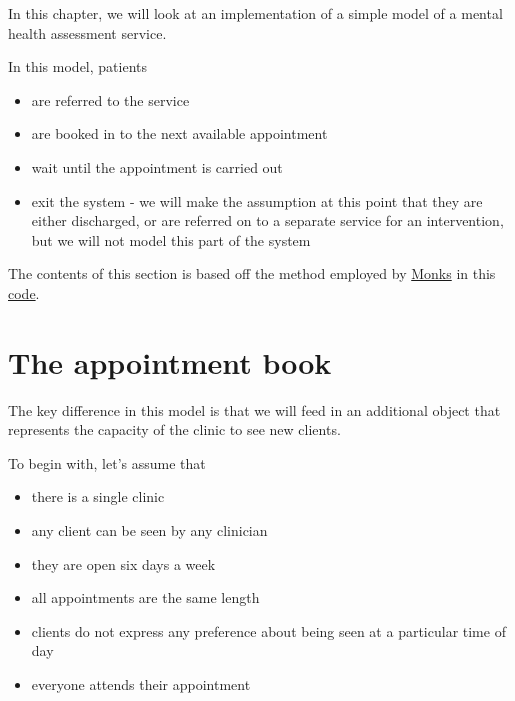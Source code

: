 \documentclass[
  letterpaper,
  DIV=11,
  numbers=noendperiod]{scrreprt}
\providecommand{\tightlist}{%
  \setlength{\itemsep}{0pt}\setlength{\parskip}{0pt}}\usepackage{longtable,booktabs,array}
\begin{document}
In this chapter, we will look at an implementation of a simple model of
a mental health assessment service.

In this model, patients

\begin{itemize}
\tightlist
\item
  are referred to the service
\item
  are booked in to the next available appointment
\item
  wait until the appointment is carried out
\item
  exit the system - we will make the assumption at this point that they
  are either discharged, or are referred on to a separate service for an
  intervention, but we will not model this part of the system
\end{itemize}

\begin{tcolorbox}[enhanced jigsaw, colframe=quarto-callout-note-color-frame, bottomtitle=1mm, breakable, rightrule=.15mm, coltitle=black, colbacktitle=quarto-callout-note-color!10!white, opacityback=0, leftrule=.75mm, arc=.35mm, toptitle=1mm, title=\textcolor{quarto-callout-note-color}{\faInfo}\hspace{0.5em}{Note}, titlerule=0mm, colback=white, toprule=.15mm, bottomrule=.15mm, left=2mm, opacitybacktitle=0.6]

The contents of this section is based off the method employed by
\href{https://orcid.org/0000-0003-2631-4481}{Monks} in this
\href{https://github.com/health-data-science-OR/stochastic_systems/tree/master/labs/simulation/lab5}{code}.

\end{tcolorbox}

\section{The appointment book}\label{the-appointment-book}

The key difference in this model is that we will feed in an additional
object that represents the capacity of the clinic to see new clients.

To begin with, let's assume that

\begin{itemize}
\tightlist
\item
  there is a single clinic
\item
  any client can be seen by any clinician
\item
  they are open six days a week
\item
  all appointments are the same length
\item
  clients do not express any preference about being seen at a particular
  time of day
\item
  everyone attends their appointment
\end{itemize}
\end{document}
